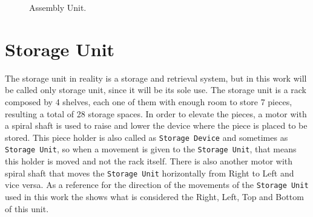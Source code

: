 \begin{figure}[H]
  \centering
  \caption{Assembly Unit.}
  \label{fig:assemblyUnit}
\end{figure}

\section{Storage Unit}
\label{sec:storageUnit}

The storage unit in reality is a storage and retrieval system, but in this work
will be called only storage unit, since it will be its sole use.
The storage unit is a rack composed by 4 shelves, each one of them with enough room to
store 7 pieces, resulting a total of 28 storage spaces. In order to elevate the
pieces, a motor with a spiral shaft is used to raise and lower the device where
the piece is placed to be stored. This piece holder is also called as
\verb|Storage Device| and sometimes as \verb|Storage Unit|, so when a movement
is given to the \verb|Storage Unit|, that means this holder is moved and not the
rack itself.
There is also another motor with spiral shaft that moves the
\verb|Storage Unit|
horizontally from Right to Left and vice versa.
As a reference for the direction of the movements of the
\verb|Storage Unit| used in this work the
 shows what is considered the Right, Left, Top and
Bottom of this unit.

